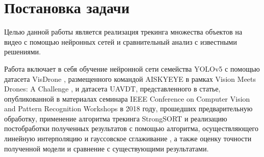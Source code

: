 \section*{Постановка задачи}

Целью данной работы является реализация трекинга множества объектов на видео с помощью нейронных сетей и сравнительный анализ с известными решениями.

Работа включает в себя обучение нейронной сети семейства YOLOv5 \cite{2-1} с помощью датасета VisDrone \cite{2-2}, размещенного командой AISKYEYE в рамках Vision Meets Drones: A Challenge \cite{2-3}, и датасета UAVDT, представленного в статье, опубликованной в материалах семинара IEEE Conference on Computer Vision and Pattern Recognition Workshops \cite{2-4} в 2018 году, прошедших предварительную обработку, применение алгоритма трекинга StrongSORT \cite{2-5} и реализацию постобработки полученных результатов с помощью алгоритма, осуществляющего линейную интерполяцию \cite{2-6} и гауссовское сглаживание \cite{2-7}, а также оценку точности полученной модели и сравнение с существующими результатами.
